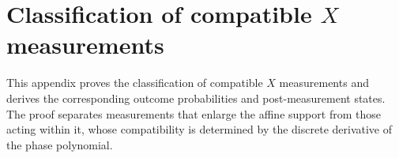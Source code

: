 \section{Classification of compatible \texorpdfstring{$X$}{X} measurements}
\label{appendix:x-measurements}

This appendix proves the classification of compatible $X$ measurements and derives the corresponding outcome probabilities and post-measurement states.
The proof separates measurements that enlarge the affine support from those acting within it, whose compatibility is determined by the discrete derivative of the phase polynomial.

\begingroup
\renewcommand{\label}[1]{}
\begin{xmeasurementrestatement}
    \xMeasurementClassificationStatement
\end{xmeasurementrestatement}
\endgroup
